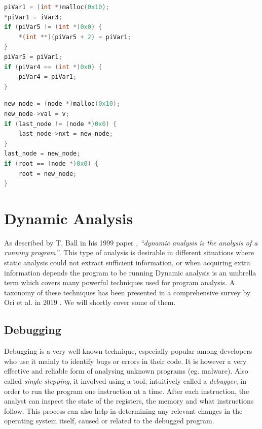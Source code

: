 \begin{lstlisting}[language=c, label={code:decompilation-1}, caption={TODO}]
piVar1 = (int *)malloc(0x10);
*piVar1 = iVar3;
if (piVar5 != (int *)0x0) {
    *(int **)(piVar5 + 2) = piVar1;
}
piVar5 = piVar1;
if (piVar4 == (int *)0x0) {
    piVar4 = piVar1;
}
\end{lstlisting}

\begin{lstlisting}[language=c, label={code:decompilation-2}, caption={TODO}]
new_node = (node *)malloc(0x10);
new_node->val = v;
if (last_node != (node *)0x0) {
    last_node->nxt = new_node;
}
last_node = new_node;
if (root == (node *)0x0) {
    root = new_node;
}
\end{lstlisting}

\section{Dynamic Analysis}

As described by T. Ball in his 1999 paper \cite{concept_of_da_1999}, \emph{``dynamic analysis is the analysis of a running program''}. This type of analysis is desirable in different situations where static analysis could not extract sufficient information, or when acquiring extra information depends the program to be running %
Dynamic analysis is an umbrella term which covers many powerful techniques used for program analysis. A taxonomy of these techniques has been presented in a comprehensive survey by Ori et al. in 2019 \cite{da_survey_2019}. We will shortly cover some of them.

\subsection{Debugging}


Debugging is a very well known technique, especially popular among developers who use it mainly to identify bugs or errors in their code. It is however a very effective and reliable form of analysing unknown programs (eg. malware). Also called \emph{single stepping}, it involved using a tool, intuitively called a \emph{debugger}, in order to run the program one instruction at a time. After each instruction, the analyst can inspect the state of the registers, the memory and what instructions follow. This process can also help in determining any relevant changes in the operating system itself, caused or related to the debugged program.

